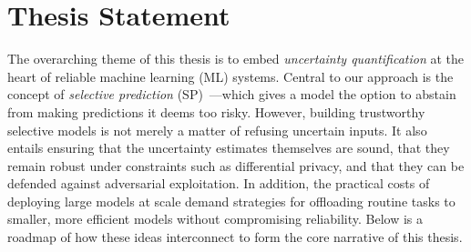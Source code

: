 

\vspace{15pt}
\section{Thesis Statement}
\label{sec:statement}

The overarching theme of this thesis is to embed \emph{uncertainty quantification} at the heart of reliable machine learning (ML) systems. Central to our approach is the concept of \emph{selective prediction} (SP)~\citep{chow1957optimum,el2010foundations}—which gives a model the option to abstain from making predictions it deems too risky. However, building trustworthy selective models is not merely a matter of refusing uncertain inputs. It also entails ensuring that the uncertainty estimates themselves are sound, that they remain robust under constraints such as differential privacy, and that they can be defended against adversarial exploitation. In addition, the practical costs of deploying large models at scale demand strategies for offloading routine tasks to smaller, more efficient models without compromising reliability. Below is a roadmap of how these ideas interconnect to form the core narrative of this thesis.

